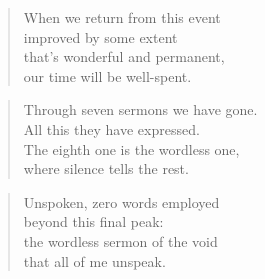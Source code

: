 \documentclass[10pt,a4paper]{article}
\begin{document}
\begin{multicols}{2}
\begin{verse}
When we return from this event\\
improved by some extent\\
that’s wonderful and permanent,\\
our time will be well-spent.
\end{verse}

\begin{verse}
Through seven sermons we have gone.\\
All this they have expressed.\\
The eighth one is the wordless one,\\
where silence tells the rest.
\end{verse}

\begin{verse}
Unspoken, zero words employed\\
beyond this final peak:\\
the wordless sermon of the void\\
that all of me unspeak.
\end{verse}

\end{multicols}

\end{document}
